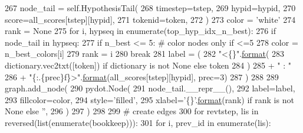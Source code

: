 \begin{DoxyCode}
267                 node\_tail = self.HypothesisTail(
268                     timestep=tstep,
269                     hypid=hypid,
270                     score=all\_scores[tstep][hypid],
271                     tokenid=token,
272                 )
273                 color = \textcolor{stringliteral}{'white'}
274                 rank = \textcolor{keywordtype}{None}
275                 \textcolor{keywordflow}{for} i, hypseq \textcolor{keywordflow}{in} enumerate(top\_hyp\_idx\_n\_best):
276                     \textcolor{keywordflow}{if} node\_tail \textcolor{keywordflow}{in} hypseq:
277                         \textcolor{keywordflow}{if} n\_best <= 5:  \textcolor{comment}{# color nodes only if <=5}
278                             color = n\_best\_colors[i]
279                         rank = i
280                         \textcolor{keywordflow}{break}
281                 label = (
282                     \textcolor{stringliteral}{"<\{\}"}.\hyperlink{namespaceparlai_1_1chat__service_1_1services_1_1messenger_1_1shared__utils_a32e2e2022b824fbaf80c747160b52a76}{format}(
283                         dictionary.vec2txt([token]) \textcolor{keywordflow}{if} dictionary \textcolor{keywordflow}{is} \textcolor{keywordflow}{not} \textcolor{keywordtype}{None} \textcolor{keywordflow}{else} token
284                     )
285                     + \textcolor{stringliteral}{" : "}
286                     + \textcolor{stringliteral}{"\{:.\{prec\}f\}>"}.\hyperlink{namespaceparlai_1_1chat__service_1_1services_1_1messenger_1_1shared__utils_a32e2e2022b824fbaf80c747160b52a76}{format}(all\_scores[tstep][hypid], prec=3)
287                 )
288 
289                 graph.add\_node(
290                     pydot.Node(
291                         node\_tail.\_\_repr\_\_(),
292                         label=label,
293                         fillcolor=color,
294                         style=\textcolor{stringliteral}{'filled'},
295                         xlabel=\textcolor{stringliteral}{'\{\}'}.\hyperlink{namespaceparlai_1_1chat__service_1_1services_1_1messenger_1_1shared__utils_a32e2e2022b824fbaf80c747160b52a76}{format}(rank) \textcolor{keywordflow}{if} rank \textcolor{keywordflow}{is} \textcolor{keywordflow}{not} \textcolor{keywordtype}{None} \textcolor{keywordflow}{else} \textcolor{stringliteral}{''},
296                     )
297                 )
298 
299         \textcolor{comment}{# create edges}
300         \textcolor{keywordflow}{for} revtstep, lis \textcolor{keywordflow}{in} reversed(list(enumerate(bookkeep))):
301             \textcolor{keywordflow}{for} i, prev\_id \textcolor{keywordflow}{in} enumerate(lis):

\end{DoxyCode}
